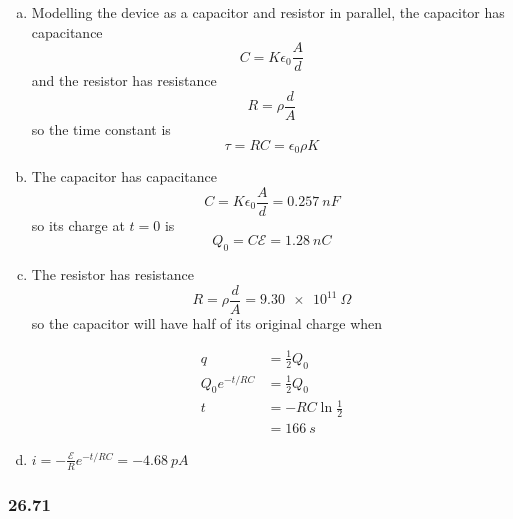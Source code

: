 \documentclass{article}
\begin{document}
\begin{enumerate}[(a)]
  \item Modelling the device as a capacitor and resistor in parallel, the capacitor has capacitance \[C = K \epsilon_0 \frac{A}{d}\] and the resistor has resistance \[R = \rho \frac{d}{A}\] so the time constant is \[\tau = R C = \epsilon_0 \rho K\]

  \item The capacitor has capacitance \[C = K \epsilon_0 \frac{A}{d} = \qty{0.257}{nF}\] so its charge at $t = 0$ is \[Q_0 = C \mathcal{E} = \qty{1.28}{nC}\]

  \item The resistor has resistance \[R = \rho \frac{d}{A} = \qty{9.30e11}{\Omega}\] so the capacitor will have half of its original charge when

        \begin{align*}
          q                & = \frac{1}{2} Q_0      \\
          Q_0 e^{-t / R C} & = \frac{1}{2} Q_0      \\
          t                & = -R C \ln \frac{1}{2} \\
                           & = \qty{166}{s}
        \end{align*}

  \item $i = -\frac{\mathcal{E}}{R} e^{-t / R C} = \qty{-4.68}{pA}$
\end{enumerate}

\subsubsection{26.71}
\end{document}
